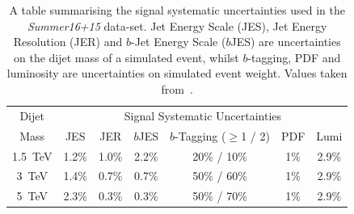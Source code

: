 \begin{table}[!htb]
  \centering
  \begin{tabular}{|c||c|c|c|c|c|c|}
    \hline
    Dijet   & \multicolumn{6}{c|}{Signal Systematic Uncertainties}                    \\ \cline{2-7} 
    Mass    & JES   & JER   & $b$JES  & $b$-Tagging ($\geq$1 / 2) & PDF & Lumi        \\
    \hline                                                                        
    1.5~TeV & 1.2\% & 1.0\% & 2.2\%   &        20\% / 10\%        & 1\% & 2.9\%       \\
    3~TeV   & 1.4\% & 0.7\% & 0.7\%   &        50\% / 60\%        & 1\% & 2.9\%       \\
    5~TeV   & 2.3\% & 0.3\% & 0.3\%   &        50\% / 70\%        & 1\% & 2.9\%       \\
    \hline
  \end{tabular}
\caption[A table summarising the signal systematic uncertainties used in the \textit{Summer16+15} data-set.]
        {A table summarising the signal systematic uncertainties used in the \textit{Summer16+15} data-set.
          Jet Energy Scale (JES), Jet Energy Resolution (JER) and $b$-Jet Energy Scale ($b$JES)
          are uncertainties on the dijet mass of a simulated event,
          whilst $b$-tagging, PDF and luminosity are uncertainties on simulated event weight.
          Values taken from~\cite{dibjet-ichep_int}.}
  \label{tab:lim-summer_syst}
  \end{table}

